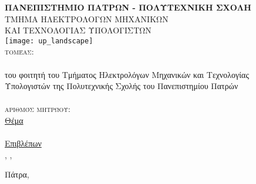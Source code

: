 \begin{titlepage}
\begin{center}
\textsc{\textbf{\large ΠΑΝΕΠΙΣΤΗΜΙΟ ΠΑΤΡΩΝ - ΠΟΛΥΤΕΧΝΙΚΗ ΣΧΟΛΗ}\\%
\large ΤΜΗΜΑ ΗΛΕΚΤΡΟΛΟΓΩΝ ΜΗΧΑΝΙΚΩΝ\\ΚΑΙ ΤΕΧΝΟΛΟΓΙΑΣ ΥΠΟΛΟΓΙΣΤΩΝ}\\

\texttt{[image: up\_landscape]}\\  

\textsc{\Large τομέας: \division}\\[1cm]

\textsc{\uline{\LARGE{\shortdoctitle}}}\\ [0.5cm]
του φοιτητή του Τμήματος Ηλεκτρολόγων Μηχανικών και Τεχνολογίας\\
Υπολογιστών της Πολυτεχνικής Σχολής  του Πανεπιστημίου Πατρών\\[1cm]

\textsc{\LARGE \meF}\\[0.5cm]
\textsc{\Large αριθμός μητρώου: \studnum}\\[1cm]

\uline{\large Θέμα}\\[0.5cm]
\textbf{\large \doctitle}\\[1cm]
\uline{\large Επιβλέπων}\\[0.5cm]
\large \supname, \suptitle, \uoP\\[1cm]
\begin{center}
\end{center}
\vfill
\large{Πάτρα, \telosmonthyear}
\end{center}
\end{titlepage}